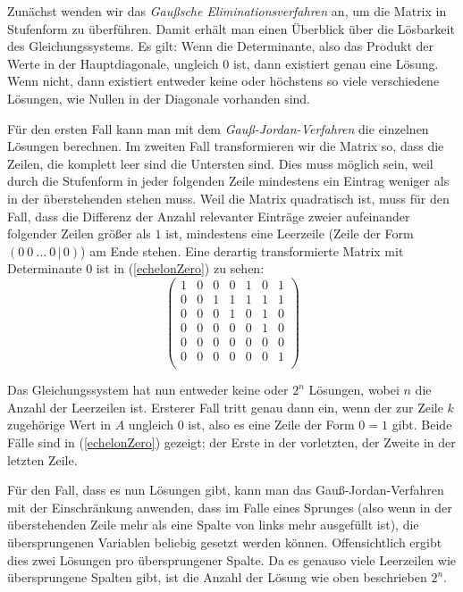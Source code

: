 \documentclass{scrartcl}
\begin{document}
Zunächst wenden wir das \emph{Gaußsche Eliminationsverfahren} an, um die
Matrix in Stufenform zu überführen. Damit erhält man einen Überblick über die
Lösbarkeit des Gleichungssystems. Es gilt: Wenn die Determinante, also das
Produkt der Werte in der Hauptdiagonale, ungleich $0$ ist, dann existiert genau
eine Lösung. Wenn nicht, dann existiert entweder keine oder höchstens so viele
verschiedene Lösungen, wie Nullen in der Diagonale vorhanden sind.

Für den ersten Fall kann man mit dem \emph{Gauß-Jordan-Verfahren} die einzelnen
Lösungen berechnen. Im zweiten Fall transformieren wir die Matrix so, dass die
Zeilen, die komplett leer sind die Untersten sind. Dies muss möglich sein,
weil durch die Stufenform in jeder folgenden Zeile mindestens ein Eintrag
weniger als in der überstehenden stehen muss. Weil die Matrix quadratisch ist,
muss für den Fall, dass die Differenz der Anzahl relevanter Einträge zweier
aufeinander folgender Zeilen größer als $1$ ist, mindestens eine Leerzeile 
(Zeile der Form $(0\ 0\ \dots\ 0\,|\,0)$) am Ende stehen. Eine derartig
transformierte Matrix mit Determinante $0$ ist in (\ref{echelonZero}) zu sehen:
\begin{equation}
\left(\begin{array}{cccccc|c}
  1&0&0&0&1&0&1\\
  0&0&1&1&1&1&1\\
  0&0&0&1&0&1&0\\
  0&0&0&0&0&1&0\\
  0&0&0&0&0&0&0\\
  0&0&0&0&0&0&1\\
\end{array}\right)\label{echelonZero}
\end{equation}

Das Gleichungssystem hat nun entweder keine oder $2^n$ Lösungen, wobei $n$ die
Anzahl der Leerzeilen ist. Ersterer Fall tritt genau dann ein, wenn der zur
Zeile $k$ zugehörige Wert in $A$ ungleich $0$ ist, also es eine Zeile der Form
$0=1$ gibt. Beide Fälle sind in (\ref{echelonZero}) gezeigt; der Erste in der
vorletzten, der Zweite in der letzten Zeile.

Für den Fall, dass es nun Lösungen gibt, kann man das Gauß-Jordan-Verfahren mit
der Einschränkung anwenden, dass im Falle eines Sprunges (also wenn in der
überstehenden Zeile mehr als eine Spalte von links mehr ausgefüllt ist), die
übersprungenen Variablen beliebig gesetzt werden können. Offensichtlich ergibt
dies zwei Lösungen pro übersprungener Spalte. Da es genauso viele Leerzeilen wie
übersprungene Spalten gibt, ist die Anzahl der Lösung wie oben beschrieben
$2^n$.
\end{document}

